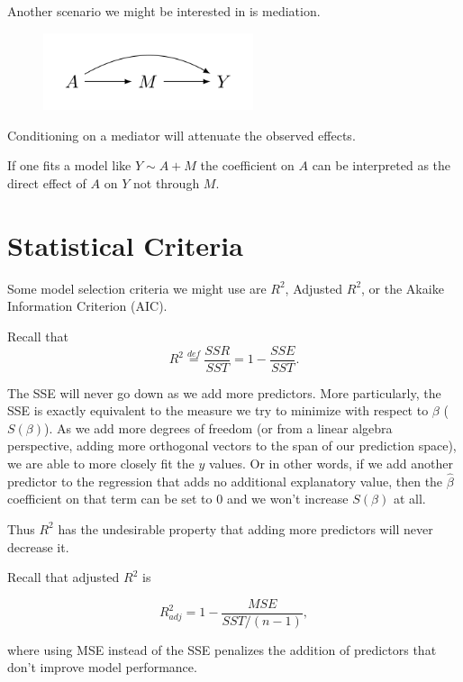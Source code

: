 \documentclass[
  letterpaper,
  DIV=11,
  numbers=noendperiod]{scrreport}
\begin{document}
Another scenario we might be interested in is {mediation}.

\begin{figure}

{\centering \includegraphics[width=0.55\textwidth,height=\textheight]{week5/standalone_figures/mediation/mediation.svg}

}

\end{figure}

Conditioning on a mediator will attenuate the observed effects.

If one fits a model like \(Y \sim A + M\) the coefficient on \(A\) can
be interpreted as the direct effect of \(A\) on \(Y\) not through \(M\).

\hypertarget{statistical-criteria}{%
\section{Statistical Criteria}\label{statistical-criteria}}

Some model selection criteria we might use are \(R^2\), Adjusted
\(R^2\), or the Akaike Information Criterion (AIC).

Recall that
\[R^2 \stackrel{def}{=} \frac{SSR}{SST} = 1 - \frac{SSE}{SST}.\]

The SSE will never go down as we add more predictors. More particularly,
the SSE is exactly equivalent to the measure we try to minimize with
respect to \(\beta\) (\(S(\beta)\)). As we add more degrees of freedom
(or from a linear algebra perspective, adding more orthogonal vectors to
the span of our prediction space), we are able to more closely fit the
\(y\) values. Or in other words, if we add another predictor to the
regression that adds no additional explanatory value, then the
\(\hat \beta\) coefficient on that term can be set to 0 and we won't
increase \(S(\beta)\) at all.

Thus \(R^2\) has the undesirable property that adding more predictors
will never decrease it.

Recall that adjusted \(R^2\) is

\[R^2_{adj} = 1 - \frac{MSE}{SST/(n-1)},\]

where using MSE instead of the SSE penalizes the addition of predictors
that don't improve model performance.
\end{document}
